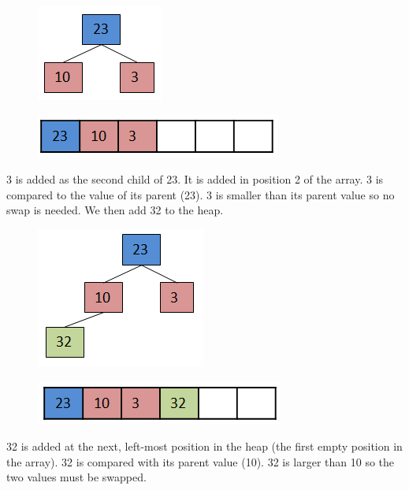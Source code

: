 \begin{figure}[H]
\centering
\includegraphics{pictures/heap4.png}
\label{fig:heap4}
\end{figure}

\begin{figure}[H]
\centering
\includegraphics{pictures/heap4a.png}
\label{fig:heap4a}
\end{figure}

3 is added as the second child of 23.   It is added in position 2 of the array.   3 is compared to the value of its parent (23).  3 is smaller than its parent value so no swap is needed.   We then add 32 to the heap.

\begin{figure}[H]
\centering
\includegraphics{pictures/heap5.png}
\label{fig:heap5}
\end{figure}

\begin{figure}[H]
\centering
\includegraphics{pictures/heap5a.png}
\label{fig:heap5a}
\end{figure}

32 is added at the next, left-most position in the heap (the first empty position in the array).  32 is compared with its parent value (10).  32 is larger than 10 so the two values must be swapped.


